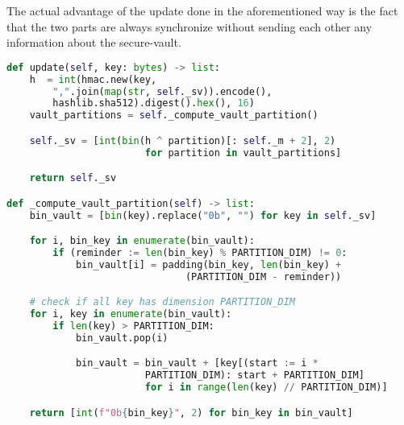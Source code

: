 The actual advantage of the update done in the aforementioned way is the fact that the two parts are always synchronize without sending each other any information about the secure-vault.

\begin{lstlisting}[language=Python, basicstyle=\tiny, label= {lst:sv-update}, caption=Secure-vault update]
def update(self, key: bytes) -> list:
    h  = int(hmac.new(key, 
        ",".join(map(str, self._sv)).encode(),
        hashlib.sha512).digest().hex(), 16)
    vault_partitions = self._compute_vault_partition()

    self._sv = [int(bin(h ^ partition)[: self._m + 2], 2) 
                        for partition in vault_partitions]

    return self._sv

def _compute_vault_partition(self) -> list:
    bin_vault = [bin(key).replace("0b", "") for key in self._sv]

    for i, bin_key in enumerate(bin_vault):
        if (reminder := len(bin_key) % PARTITION_DIM) != 0:
            bin_vault[i] = padding(bin_key, len(bin_key) +
                               (PARTITION_DIM - reminder))

    # check if all key has dimension PARTITION_DIM
    for i, key in enumerate(bin_vault):
        if len(key) > PARTITION_DIM:
            bin_vault.pop(i)

            bin_vault = bin_vault + [key[(start := i * 
                        PARTITION_DIM): start + PARTITION_DIM]
                        for i in range(len(key) // PARTITION_DIM)]

    return [int(f"0b{bin_key}", 2) for bin_key in bin_vault]
\end{lstlisting}